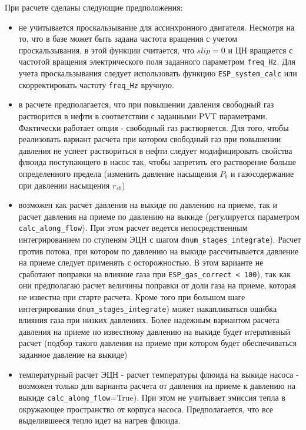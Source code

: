 При расчете сделаны следующие предположения:
\begin{itemize}
	\item не учитывается проскальзывание для ассинхронного двигателя. Несмотря на то, что в базе может быть задана частота вращения с учетом проскальзывания, в этой функции считается, что \(slip = 0\) и ЦН вращается с частотой вращения электрического поля заданного параметром \texttt{freq_Hz}. Для учета проскальзывания следует использовать функцию \texttt{ESP_system_calc} или скорректировать частоту \texttt{freq_Hz} вручную.
	\item в расчете предполагается, что при повышении давления свободный газ растворится в нефти в соответствии с заданными PVT параметрами. Фактически работает опция - свободный газ растворяется. Для того, чтобы реализовать вариант расчета при котором свободный газ при повышении давления не успеет раствориться в нефти следует модифицировать свойства флюида поступающего в насос так, чтобы запретить его растворение больше определенного предела (изменить давление насыщения $P_b$ и газосодержание при давлении насыщения $r_{sb}$)
	\item возможен как расчет давления на выкиде по давлению на приеме, так и расчет давления на приеме по давлению на выкиде (регулируется параметром \texttt{calc_along_flow}). При этом расчет ведется непосредственным интегрированием по ступеням ЭЦН с шагом \texttt{dnum_stages_integrate}). Расчет против потока, при котором по давлению на выкиде рассчитывается давление на приеме следует применять с осторожностью. В этом варианте не сработают поправки на влияние газа при  \texttt{ESP_gas_correct < 100}), так как они предполагаю расчет величины поправки от доли газа на приеме, которая не известна при старте расчета. Кроме того при большом шаге интегрирования \texttt{dnum_stages_integrate}) может накапливаться ошибка влияния газа при низких давлениях. Более надежным вариантом расчета давления на приеме по известному давлению на выкиде будет итеративный расчет (подбор такого давления на приеме при котором будет обеспечиваться заданное давление на выкиде)
	\item температурный расчет ЭЦН - расчет температуры флюида на выкиде насоса - возможен только для варианта расчета от давления на приеме к давлению на выкиде  \texttt{calc_along_flow}=True). При этом не учитывает эмиссия тепла в окружающее пространство от корпуса насоса. Предполагается, что все выделившееся тепло идет на нагрев флюида.
	
\end{itemize}

